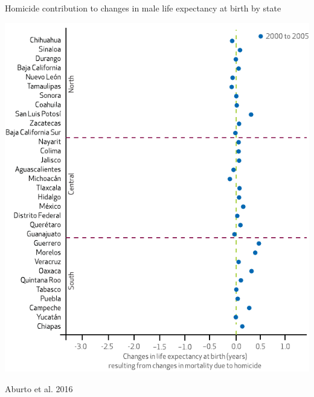 \documentclass[xcolor={dvipsnames}]{beamer}
\begin{document}
\begin{frame}
	\begin{center}
		\Large{Homicide contribution to changes in male life expectancy at birth by state}
	\end{center}

	\begin{center}
		\includegraphics[scale=.62]{Figures/State_homicides_1}
	\end{center}
	
	\tiny{Aburto et al. 2016}				
\end{frame}
\end{document}
